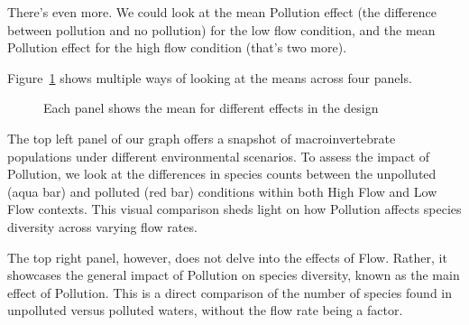 \documentclass[
  letterpaper,
  DIV=11,
  numbers=noendperiod]{scrreprt}
\begin{document}
There's even more. We could look at the mean Pollution effect (the
difference between pollution and no pollution) for the low flow
condition, and the mean Pollution effect for the high flow condition
(that's two more).

Figure~\ref{fig-10alleffects} shows multiple ways of looking at the
means across four panels.

\begin{figure}


\caption{\label{fig-10alleffects}Each panel shows the mean for different
effects in the design}

\end{figure}%

The top left panel of our graph offers a snapshot of macroinvertebrate
populations under different environmental scenarios. To assess the
impact of Pollution, we look at the differences in species counts
between the unpolluted (aqua bar) and polluted (red bar) conditions
within both High Flow and Low Flow contexts. This visual comparison
sheds light on how Pollution affects species diversity across varying
flow rates.

The top right panel, however, does not delve into the effects of Flow.
Rather, it showcases the general impact of Pollution on species
diversity, known as the main effect of Pollution. This is a direct
comparison of the number of species found in unpolluted versus polluted
waters, without the flow rate being a factor.
\end{document}
